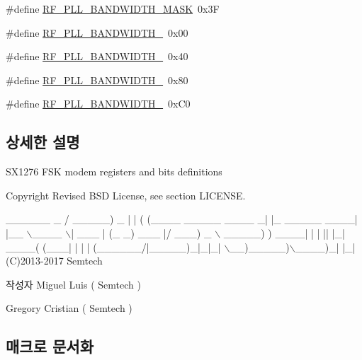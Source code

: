 \begin{DoxyCompactItemize}
\item 
\#define \mbox{\hyperlink{sx1276_regs-_fsk_8h_aac01efdf312f6264cbd8b48d6c94e0ea}{R\+F\+\_\+\+P\+L\+L\+\_\+\+B\+A\+N\+D\+W\+I\+D\+T\+H\+\_\+\+M\+A\+SK}}~0x3F
\item 
\#define \mbox{\hyperlink{sx1276_regs-_fsk_8h_afdfab4acc3525e87ce252cbf593c3255}{R\+F\+\_\+\+P\+L\+L\+\_\+\+B\+A\+N\+D\+W\+I\+D\+T\+H\+\_}}~0x00
\item 
\#define \mbox{\hyperlink{sx1276_regs-_fsk_8h_acb5d72344cac01094235aaf62ac05399}{R\+F\+\_\+\+P\+L\+L\+\_\+\+B\+A\+N\+D\+W\+I\+D\+T\+H\+\_}}~0x40
\item 
\#define \mbox{\hyperlink{sx1276_regs-_fsk_8h_aa5f41821cba4e1c23b0cf8b6eb05d021}{R\+F\+\_\+\+P\+L\+L\+\_\+\+B\+A\+N\+D\+W\+I\+D\+T\+H\+\_}}~0x80
\item 
\#define \mbox{\hyperlink{sx1276_regs-_fsk_8h_ae1e12342489e52885c9de6812079d6e8}{R\+F\+\_\+\+P\+L\+L\+\_\+\+B\+A\+N\+D\+W\+I\+D\+T\+H\+\_}}~0x\+C0
\end{DoxyCompactItemize}


\subsection{상세한 설명}
S\+X1276 F\+SK modem registers and bits definitions 

\begin{DoxyCopyright}{Copyright}
Revised B\+SD License, see section L\+I\+C\+E\+N\+SE.
\end{DoxyCopyright}

\begin{DoxyCode}
  \_\_\_\_\_\_                              \_
 / \_\_\_\_\_)             \_              | |
( (\_\_\_\_  \_\_\_\_\_ \_\_\_\_ \_| |\_ \_\_\_\_\_  \_\_\_\_| |\_\_
 \(\backslash\)\_\_\_\_ \(\backslash\)| \_\_\_ |    (\_   \_) \_\_\_ |/ \_\_\_)  \_ \(\backslash\)
 \_\_\_\_\_) ) \_\_\_\_| | | || |\_| \_\_\_\_( (\_\_\_| | | |
(\_\_\_\_\_\_/|\_\_\_\_\_)\_|\_|\_| \(\backslash\)\_\_)\_\_\_\_\_)\(\backslash\)\_\_\_\_)\_| |\_|
(C)2013-2017 Semtech
\end{DoxyCode}


\begin{DoxyAuthor}{작성자}
Miguel Luis ( Semtech )

Gregory Cristian ( Semtech ) 
\end{DoxyAuthor}


\subsection{매크로 문서화}
\mbox{\label{sx1276_regs-_fsk_8h_aa4a7b5b5d63e9f8ef8f8dc4d7984753c}} 
